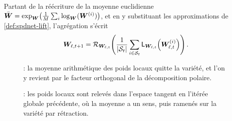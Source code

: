 \begin{definition}
\label{def:spdnet-rlavg}
  Partant de la réécriture de la moyenne euclidienne
  $\bar{\boldsymbol{W}}=\exp_{\boldsymbol{W}}\!\left(\frac{1}{M}\sum_i\log_{\boldsymbol{W}}(\boldsymbol{W}^{(i)})\right)$,
  et en y substituant les approximations de \cref{def:spdnet-lift}, l'agrégation
  s'écrit
  \begin{equation}
    \boldsymbol{W}_{\ell,t+1}
    =
    \mathcal{R}_{\boldsymbol{W}_{\ell,t}}\!\left(
      \frac{1}{|\mathcal{S}_t|}\sum_{i\in\mathcal{S}_t}
      \mathsf{L}_{\boldsymbol{W}_{\ell,t}}\!\left(\boldsymbol{W}_{\ell,t}^{(i)}\right)
    \right).
    \label{eq:spdnet-rlavg}
  \end{equation}
\end{definition}

\begin{figure}[p]
  \begin{center}
    \makebox[\textwidth][c]{}
  \end{center}
  \caption[Agrégation par projection]{: la moyenne
    arithmétique des poids locaux quitte la variété, et l'on y revient par le
    facteur orthogonal de la décomposition polaire. %
  }
  \label{fig:spdnet-projavg}
\end{figure}

\begin{figure}[p]
  \begin{center}
    \makebox[\textwidth][c]{}
  \end{center}
  \caption[Agrégation par relèvement et rétraction]{: les poids
    locaux sont relevés dans l'espace tangent en l'itérée globale précédente, où
    la moyenne a un sens, puis ramenés sur la variété par rétraction.
  }
  \label{fig:spdnet-rlavg}
\end{figure}


